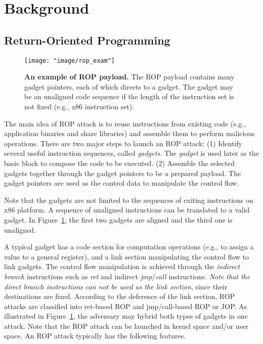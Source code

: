 \section{Background} \label{sec:preli}

\subsection{Return-Oriented Programming}

\begin{figure}[!ht]
 \centering
\texttt{[image: "image/rop\_exam"]}
\caption{\textbf{An example of ROP payload.} The ROP payload contains many gadget pointers, each of which directs to a gadget. The gadget may be an unaligned code sequence if the length of the instruction set is not fixed (e.g., x86 instruction set).}\label{fig:rop_exam}
\end{figure}

The main idea of ROP attack is to reuse instructions from existing code (e.g., application binaries and share libraries) and assemble them to perform malicious operations. There are two major steps to launch an ROP attack: (1) Identify several useful instruction sequences, called \emph{gadgets}. The \emph{gadget} is used later as the basic block to compose the code to be executed. (2) Assemble the selected gadgets together through the gadget pointers to be a prepared payload. The gadget pointers are used as the control data to manipulate the control flow.

Note that the gadgets are not limited to the sequences of exiting instructions on x86 platform. A sequence of unaligned instructions can be translated to a valid gadget. In Figure~\ref{fig:rop_exam}, the first two gadgets are aligned and the third one is unaligned. %

A typical gadget has a code section for computation operations (e.g., to assign a value to a general register), and a link section manipulating the control flow to link gadgets. The control flow manipulation is achieved through the \emph{indirect branch} instructions such as \emph{ret} and  indirect \emph{jmp}/\emph{call} instructions. \emph{Note that the direct branch instructions can not be used as the link section}, since their destinations are fixed. According to the deference of the link section, ROP attacks are classified into ret-based ROP and jmp/call-based ROP or JOP. As illustrated in Figure~\ref{fig:rop_exam}, the adversary may hybrid both types of gadgets in one attack. Note that the ROP attack can be launched in kernel space and/or user space. An ROP attack typically has the following features.

